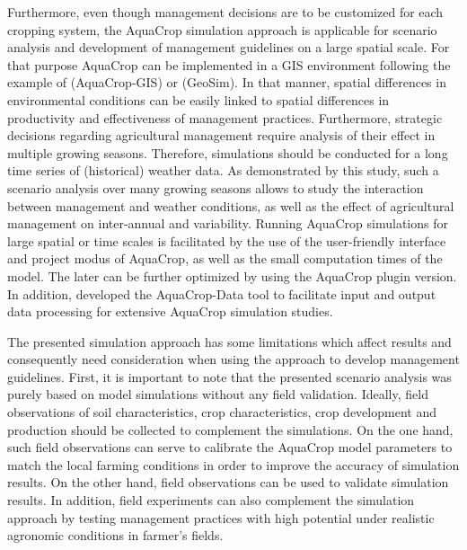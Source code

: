 Furthermore, even though management decisions are to be customized for each cropping system, the AquaCrop simulation approach is applicable for scenario analysis and development of management guidelines on a large spatial scale. For that purpose AquaCrop can be implemented in a GIS environment following the example of \textcite{lorite2013} (AquaCrop-GIS) or \textcite{thorp2013} (GeoSim). In that manner, spatial differences in environmental conditions can be easily linked to spatial differences in productivity and effectiveness of management practices. Furthermore, strategic decisions regarding agricultural management require analysis of their effect in multiple growing seasons. Therefore, simulations should be conducted for a long time series of (historical) weather data. As demonstrated by this study, such a scenario analysis over many growing seasons allows to study the interaction between management and weather conditions, as well as the effect of agricultural management on inter-annual \Y and \WPET variability. Running AquaCrop simulations for large spatial or time scales is facilitated by the use of the user-friendly interface and project modus of AquaCrop, as well as the small computation times of the model. The later can be further optimized by using the AquaCrop plugin version. In addition, \textcite{lorite2013} developed the AquaCrop-Data tool to facilitate input and output data processing for extensive AquaCrop simulation studies. 

The presented simulation approach has some limitations which affect results and consequently need consideration when using the approach to develop management guidelines. First, it is important to note that the presented scenario analysis was purely based on model simulations without any field validation. Ideally, field observations of soil characteristics, crop characteristics, crop development and production should be collected to complement the simulations. On the one hand, such field observations can serve to calibrate the AquaCrop model parameters to match the local farming conditions in order to improve the accuracy of simulation results. On the other hand, field observations can be used to validate simulation  results. In addition, field experiments can also complement the simulation approach by testing management practices with high potential under realistic agronomic conditions in farmer's fields.

